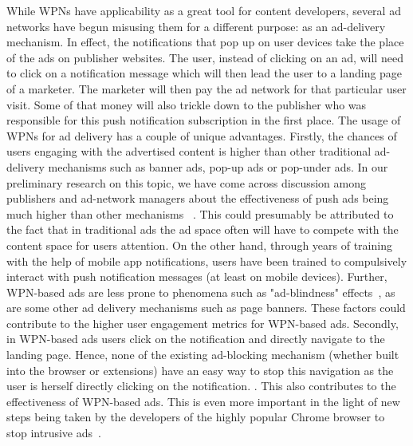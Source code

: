 While WPNs have applicability as a great tool for content developers, several ad networks have begun misusing them for a different purpose: as an ad-delivery mechanism. 
%
%
In effect, the notifications that pop up on user devices take the place of the ads on publisher websites. The user, instead of clicking on an ad, will need to click on a notification message which will then lead the user to a landing page of a marketer. The marketer will then pay the ad network for that particular user visit. Some of that money will also trickle down to the publisher who was responsible for this push notification subscription in the first place. The usage of WPNs for ad delivery has a couple of unique advantages. Firstly, the chances of users engaging with the advertised content is higher than other traditional ad-delivery mechanisms such as banner ads, pop-up ads or pop-under ads. In our preliminary research on this topic, we have come across discussion among publishers and ad-network managers about the effectiveness of push ads being much higher than other mechanisms ~\cite{x}. This could presumably be attributed to the fact that in traditional ads the ad space often will have to compete with the content space for users attention. On the other hand, through years of training with the help of mobile app notifications, users have been trained to compulsively interact with push notification messages (at least on mobile devices). Further, WPN-based ads are less prone to phenomena such as "ad-blindness" effects~\cite{x}, as are some other ad delivery mechanisms such as page banners. These factors could contribute to the higher user engagement metrics for WPN-based ads. Secondly, in WPN-based ads users click on the notification and directly navigate to the landing page. Hence, none of the existing ad-blocking mechanism (whether built into the browser or extensions) have an easy way to stop this navigation as the user is herself directly clicking on the notification. . This also contributes to the effectiveness of WPN-based ads. This is even more important in the light of new steps being taken by the developers of the highly popular Chrome browser to stop intrusive ads~\cite{x}. 


